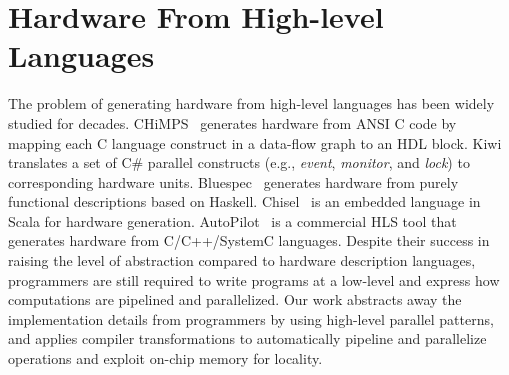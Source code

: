 
\section{Hardware From High-level Languages}
The problem of generating hardware from high-level languages has been widely studied for
decades.  CHiMPS~\cite{chimps} generates hardware from ANSI C code by
mapping each C language construct in a data-flow graph to an HDL block.
Kiwi~\cite{kiwi} translates a set of C\# parallel constructs (e.g.,
\emph{event}, \emph{monitor}, and \emph{lock}) to corresponding hardware units.
Bluespec~\cite{bluespec} generates hardware from purely functional descriptions
based on Haskell.  Chisel~\cite{chisel} is an embedded language in Scala
for hardware generation.  AutoPilot~\cite{autopilot} is a commercial HLS
tool that generates hardware from C/C++/SystemC languages.  Despite their
success in raising the level of abstraction compared to hardware description
languages, programmers are still required to write programs at a low-level and
express how computations are pipelined and parallelized. Our work
abstracts away the implementation details from programmers by using high-level
parallel patterns, and applies compiler transformations to
automatically pipeline and parallelize operations and exploit on-chip memory
for locality.

